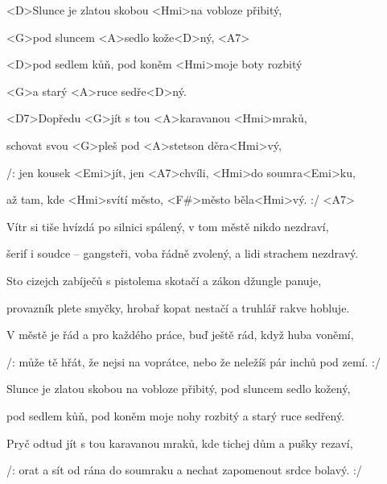 

\zs
<D>Slunce je zlatou skobou <Hmi>na vobloze přibitý,

<G>pod sluncem <A>sedlo kože<D>ný, <A7>

<D>pod sedlem kůň, pod koněm <Hmi>moje boty rozbitý

<G>a starý <A>ruce sedře<D>ný.
\ks

\zr
<D7>Dopředu <G>jít s tou <A>karavanou <Hmi>mraků,

schovat svou <G>pleš pod <A>stetson děra<Hmi>vý,

/: jen kousek <Emi>jít, jen <A7>chvíli, <Hmi>do soumra<Emi>ku,

až tam, kde <Hmi>svítí město, <F#>město běla<Hmi>vý. :/ <A7>
\kr

\zs
Vítr si tiše hvízdá po silnici spálený, v tom městě nikdo nezdraví,

šerif i soudce -- gangsteři, voba řádně zvolený, a lidi strachem nezdravý.
\ks

\zs
Sto cizejch zabíječů s pistolema skotačí a zákon džungle panuje,

provazník plete smyčky, hrobař kopat nestačí a truhlář rakve hobluje.
\ks

\zr
V městě je řád a pro každého práce, buď ještě rád, když huba voněmí,

/: může tě hřát, že nejsi na voprátce, nebo že neležíš pár inchů pod zemí. :/
\kr

\zs
Slunce je zlatou skobou na vobloze přibitý, pod sluncem sedlo kožený,

pod sedlem kůň, pod koněm moje nohy rozbitý a starý ruce sedřený.
\ks

\zr
Pryč odtud jít s tou karavanou mraků, kde tichej dům a pušky rezaví,

/: orat a sít od rána do soumraku a nechat zapomenout srdce bolavý. :/
\kr

\kp
